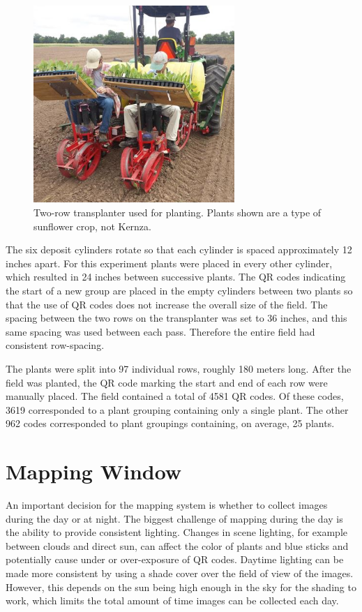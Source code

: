 \begin{figure}
	\centering
    \includegraphics[width=3in]{figures/transplanter.jpg}
    \caption[Transplanter]{Two-row transplanter used for planting. Plants shown are a type of sunflower crop, not Kernza.}
    \label{figure:transplanter}
\end{figure}  

The six deposit cylinders rotate so that each cylinder is spaced approximately 12 inches apart. For this experiment plants were placed in every other cylinder, which resulted in 24 inches between successive plants.  The QR codes indicating the start of a new group are placed in the empty cylinders between two plants so that the use of QR codes does not increase the overall size of the field. The spacing between the two rows on the transplanter was set to 36 inches, and this same spacing was used between each pass.  Therefore the entire field had consistent row-spacing. 

The plants were split into 97 individual rows, roughly 180 meters long.  After the field was planted, the QR code marking the start and end of each row were manually placed.  The field contained a total of 4581 QR codes.  Of these codes, 3619 corresponded to a plant grouping containing only a single plant.  The other 962 codes corresponded to plant groupings containing, on average, 25 plants.  

\section{Mapping Window}

An important decision for the mapping system is whether to collect images during the day or at night.  The biggest challenge of mapping during the day is the ability to provide consistent lighting.  Changes in scene lighting, for example between clouds and direct sun, can affect the color of plants and blue sticks and potentially cause under or over-exposure of QR codes.  Daytime lighting can be made more consistent by using a shade cover over the field of view of the images.  However, this depends on the sun being high enough in the sky for the shading to work, which limits the total amount of time images can be collected each day.  

